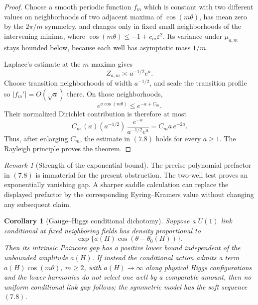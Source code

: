 \documentclass[11pt]{article}
\newtheorem{corollary}[theorem]{Corollary}
\theoremstyle{remark}
\newtheorem{remark}[theorem]{Remark}
\begin{document}
\begin{proof}
Choose a smooth periodic function \(f_m\) which is constant with
two different values on neighborhoods of two adjacent maxima of
\(\cos(m\theta)\), has mean zero by the \(2\pi/m\) symmetry, and
changes only in fixed small neighborhoods of the intervening
minima, where \(\cos(m\theta)\le-1+c_m\varepsilon^2\).
Its variance under \(\mu_{a,m}\) stays bounded below, because each
well has asymptotic mass \(1/m\).

Laplace's estimate at the \(m\) maxima gives
\[
 Z_{a,m}\asymp a^{-1/2}e^a.                                 \tag{7.10}
\]
Choose transition neighborhoods of width \(a^{-1/2}\), and scale
the transition profile so \(|f_m'|=O(\sqrt a)\) there.
On those neighborhoods,
\[
 e^{a\cos(m\theta)}\le e^{-a+C_m}.
\]
Their normalized Dirichlet contribution is therefore at most
\[
 C_m\,
 (a)(a^{-1/2})\,
 \frac{e^{-a}}{a^{-1/2}e^a}
 =C_m a\,e^{-2a}.                                            \tag{7.11}
\]
Thus, after enlarging \(C_m\), the estimate in \((7.8)\) holds for every \(a\ge1\).  The Rayleigh principle
proves the theorem.
\end{proof}

\begin{remark}[Strength of the exponential bound]
\label{rem:v15v7-bound}
The precise polynomial prefactor in \((7.8)\) is immaterial for
the present obstruction.  The two-well test proves an
exponentially vanishing gap.  A sharper saddle calculation can
replace the displayed prefactor by the corresponding
Eyring--Kramers value without changing any subsequent claim.
\end{remark}

\begin{corollary}[Gauge--Higgs conditional dichotomy]
\label{cor:v15v7-dichotomy}
Suppose a \(U(1)\) link conditional at fixed neighboring fields
has density proportional to
\[
 \exp\{a(H)\cos(\theta-\theta_0(H))\}.                        \tag{7.12}
\]
Then its intrinsic Poincare gap has a positive lower bound
independent of the unbounded amplitude \(a(H)\).
If instead the conditional action admits a term
\(a(H)\cos(m\theta)\), \(m\ge2\), with
\(a(H)\to\infty\) along physical Higgs configurations and the
lower harmonics do not select one well by a comparable amount,
then no uniform conditional link gap follows; the symmetric model
has the soft sequence \((7.8)\).
\end{corollary}
\end{document}
